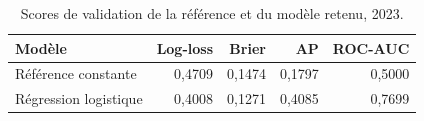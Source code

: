 \begin{table}[htbp]
\centering\small
\renewcommand{\arraystretch}{1.18}
\caption{Scores de validation de la référence et du modèle retenu, 2023.}\label{tab:ml-validation}
\begin{tabular*}{\textwidth}{@{\extracolsep{\fill}}lrrrr@{}}
\toprule
Modèle & Log-loss & Brier & AP & ROC-AUC \\
\midrule
Référence constante & 0,4709 & 0,1474 & 0,1797 & 0,5000 \\
Régression logistique & 0,4008 & 0,1271 & 0,4085 & 0,7699 \\
\bottomrule
\end{tabular*}
\end{table}
